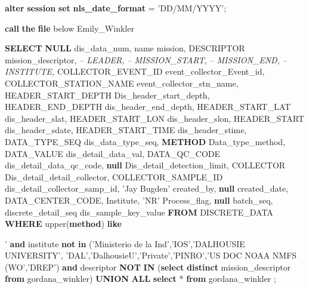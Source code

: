 \documentclass[]{article}
\newenvironment{Shaded}{\begin{snugshade}}{\end{snugshade}}
\newcommand{\KeywordTok}[1]{\textcolor[rgb]{0.13,0.29,0.53}{\textbf{#1}}}
\newcommand{\StringTok}[1]{\textcolor[rgb]{0.31,0.60,0.02}{#1}}
\newcommand{\CommentTok}[1]{\textcolor[rgb]{0.56,0.35,0.01}{\textit{#1}}}
\newcommand{\FunctionTok}[1]{\textcolor[rgb]{0.00,0.00,0.00}{#1}}
\newcommand{\NormalTok}[1]{#1}
\begin{document}
\begin{Shaded}
\begin{Highlighting}[]

\KeywordTok{alter} \KeywordTok{session} \KeywordTok{set} \KeywordTok{nls_date_format}\NormalTok{ = }\StringTok{'DD/MM/YYYY'}\NormalTok{;}

\KeywordTok{call} \KeywordTok{the} \KeywordTok{file}\NormalTok{ below Emily_Winkler}

\KeywordTok{SELECT} 
\KeywordTok{NULL}\NormalTok{ dis_data_num,}
\NormalTok{  name mission,}
\NormalTok{  DESCRIPTOR mission_descriptor,}
\CommentTok{--  LEADER,}
\CommentTok{--  MISSION_START,}
\CommentTok{--  MISSION_END,}
\CommentTok{--  INSTITUTE,}
\NormalTok{  COLLECTOR_EVENT_ID event_collector_Event_id,}
\NormalTok{  COLLECTOR_STATION_NAME event_collector_stn_name,}
\NormalTok{  HEADER_START_DEPTH Dis_header_start_depth,}
\NormalTok{  HEADER_END_DEPTH dis_header_end_depth,}
\NormalTok{  HEADER_START_LAT dis_header_slat,}
\NormalTok{  HEADER_START_LON dis_header_slon,}
\NormalTok{  HEADER_START dis_header_sdate,}
\NormalTok{  HEADER_START_TIME dis_header_stime,}
\NormalTok{  DATA_TYPE_SEQ dis_data_type_seq,}
  \KeywordTok{METHOD}\NormalTok{ Data_type_method,}
\NormalTok{  DATA_VALUE dis_detail_data_val,   }
\NormalTok{  DATA_QC_CODE dis_detail_data_qc_code,}
  \KeywordTok{null}\NormalTok{ Dis_detail_detection_limit,}
\NormalTok{  COLLECTOR Dis_detail_detail_collector,}
\NormalTok{  COLLECTOR_SAMPLE_ID dis_detail_collector_samp_id,}
  \StringTok{'Jay Bugden'}\NormalTok{ created_by,}
  \KeywordTok{null}\NormalTok{ created_date,}
\NormalTok{  DATA_CENTER_CODE,}
\NormalTok{  Institute,}
  \StringTok{'NR'}\NormalTok{ Process_flag,}
  \KeywordTok{null}\NormalTok{ batch_seq,}
\NormalTok{  discrete_detail_seq dis_sample_key_value}
\KeywordTok{FROM}\NormalTok{ DISCRETE_DATA}
\KeywordTok{WHERE} \FunctionTok{upper}\NormalTok{(}\KeywordTok{method}\NormalTok{) }\KeywordTok{like} \StringTok{'%WINKLER%'}
\KeywordTok{and}\NormalTok{ institute }\KeywordTok{not} \KeywordTok{in}\NormalTok{ (}\StringTok{'Ministerio de la Ind'}\NormalTok{,}\StringTok{'IOS'}\NormalTok{,}\StringTok{'DALHOUSIE UNIVERSITY'}\NormalTok{,}
\StringTok{'DAL'}\NormalTok{,}\StringTok{'DalhousieU'}\NormalTok{,}\StringTok{'Private'}\NormalTok{,}\StringTok{'PINRO'}\NormalTok{,}\StringTok{'US DOC NOAA NMFS (WO'}\NormalTok{,}\StringTok{'DREP'}\NormalTok{)}
\KeywordTok{and}\NormalTok{ descriptor }\KeywordTok{NOT} \KeywordTok{IN}
\NormalTok{(}\KeywordTok{select} \KeywordTok{distinct}\NormalTok{ mission_descriptor }\KeywordTok{from}\NormalTok{ gordana_winkler)}
\KeywordTok{UNION} \KeywordTok{ALL}
\KeywordTok{select}\NormalTok{ * }\KeywordTok{from}\NormalTok{ gordana_winkler}
\NormalTok{;}

}
\end{Highlighting}
\end{Shaded}
\end{document}
